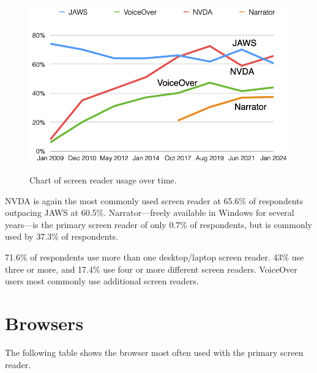 \begin{figure}[htbp]
\centering
{}
\includegraphics[alt={This bar chart compares the percentage of respondents reporting use of various screen readers (JAWS, NVDA, VoiceOver, and others) across several survey years. JAWS and NVDA are the most commonly used, with NVDA showing significant growth. VoiceOver usage remains steady, while other screen readers have lower and declining usage rates.}]{images/SR-2.png}
\caption{Chart of screen reader usage over time.}
\label{fig:sr2}
\tagstructend
\end{figure}

NVDA is again the most commonly used screen reader at 65.6\% of respondents outpacing JAWS at 60.5\%. Narrator—freely available in Windows for several years—is the primary screen reader of only 0.7\% of respondents, but is commonly used by 37.3\% of respondents.

71.6\% of respondents use more than one desktop/laptop screen reader. 43\% use three or more, and 17.4\% use four or more different screen readers. VoiceOver users most commonly use additional screen readers.

\section{Browsers}

The following table shows the browser most often used with the primary screen reader.

